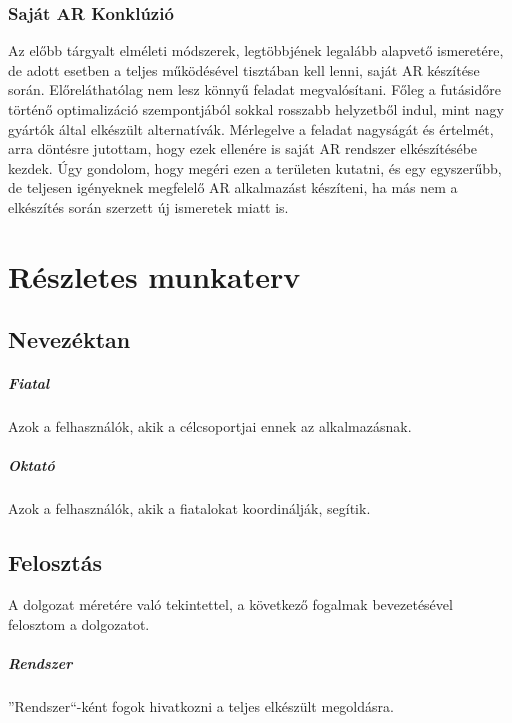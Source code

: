 \documentclass[12pt,a4paper,oneside]{report} %
\begin{document}
\subsection{Saját AR Konklúzió}
Az előbb tárgyalt elméleti módszerek, legtöbbjének legalább alapvető ismeretére, de adott esetben a teljes  működésével tisztában kell lenni, saját AR készítése során. Előreláthatólag nem lesz könnyű feladat megvalósítani. Főleg a futásidőre történő optimalizáció szempontjából sokkal rosszabb helyzetből indul, mint nagy gyártók által elkészült alternatívák. Mérlegelve a feladat nagyságát és értelmét, arra döntésre jutottam, hogy ezek ellenére is saját AR rendszer elkészítésébe kezdek. Úgy gondolom, hogy megéri ezen a területen kutatni, és egy egyszerűbb, de teljesen igényeknek megfelelő AR alkalmazást készíteni, ha más nem a elkészítés során szerzett új ismeretek miatt is.

\chapter{Részletes munkaterv}
\label{munakterv}
\section{Nevezéktan}
\paragraph{Fiatal} Azok a felhasználók, akik a célcsoportjai ennek az alkalmazásnak.
\paragraph{Oktató} Azok a felhasználók, akik a fiatalokat koordinálják, segítik.

\section{Felosztás}
A dolgozat méretére való tekintettel, a következő fogalmak bevezetésével felosztom a dolgozatot.
\paragraph{Rendszer}
''Rendszer``-ként fogok hivatkozni a teljes elkészült megoldásra.
\end{document}
